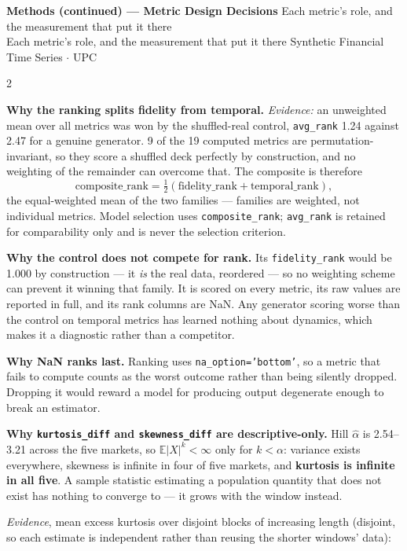 \documentclass[10pt]{article}
\newcommand{\pagehead}[2]{%
  \begin{tcolorbox}[enhanced,arc=0pt,outer arc=0pt,boxrule=0pt,
    colback=Navy,colframe=Navy,
    top=5pt,bottom=5pt,left=8pt,right=8pt,
    before skip=0pt,after skip=10pt]
  {\color{white}\large\bfseries #1}%
  \ifx\relax#2\relax\else\\[1pt]{\color{blue!30!white}\small #2}\fi
  \hfill{\color{blue!20!white}\footnotesize Synthetic Financial Time Series $\cdot$ UPC}
  \end{tcolorbox}}
\newcommand{\E}{\mathbb{E}}
\begin{document}
\clearpage

\pagehead{Methods (continued) --- Metric Design Decisions}
         {Each metric's role, and the measurement that put it there}

\begin{multicols}{2}
\small

\textbf{Why the ranking splits fidelity from temporal.}
\textit{Evidence:} an unweighted mean over all metrics was won by the shuffled-real control, \texttt{avg\_rank} 1.24 against 2.47 for a genuine generator. 9 of the 19 computed metrics are permutation-invariant, so they score a shuffled deck perfectly by construction, and no weighting of the remainder can overcome that. The composite is therefore
\[ \text{composite\_rank} = \tfrac{1}{2}\left(\text{fidelity\_rank} + \text{temporal\_rank}\right), \]
the equal-weighted mean of the two families --- families are weighted, not individual metrics. Model selection uses \texttt{composite\_rank}; \texttt{avg\_rank} is retained for comparability only and is never the selection criterion.

\smallskip
\textbf{Why the control does not compete for rank.}
Its \texttt{fidelity\_rank} would be 1.000 by construction --- it \emph{is} the real data, reordered --- so no weighting scheme can prevent it winning that family. It is scored on every metric, its raw values are reported in full, and its rank columns are NaN. Any generator scoring worse than the control on temporal metrics has learned nothing about dynamics, which makes it a diagnostic rather than a competitor.

\smallskip
\textbf{Why NaN ranks last.}
Ranking uses \texttt{na\_option='bottom'}, so a metric that fails to compute counts as the worst outcome rather than being silently dropped. Dropping it would reward a model for producing output degenerate enough to break an estimator.

\smallskip
\textbf{Why \texttt{kurtosis\_diff} and \texttt{skewness\_diff} are descriptive-only.}
Hill $\hat\alpha$ is 2.54--3.21 across the five markets, so $\E|X|^k<\infty$ only for $k<\alpha$: variance exists everywhere, skewness is infinite in four of five markets, and \textbf{kurtosis is infinite in all five}. A sample statistic estimating a population quantity that does not exist has nothing to converge to --- it grows with the window instead.

\textit{Evidence}, mean excess kurtosis over disjoint blocks of increasing length (disjoint, so each estimate is independent rather than reusing the shorter windows' data):


\end{multicols}
\end{document}

